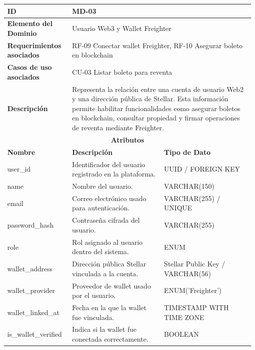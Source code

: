 \documentclass[12pt,letterpaper]{article}
\begin{document}
\begin{table}[H]
\centering
\scriptsize
\renewcommand{\arraystretch}{1.12}
\setlength{\tabcolsep}{4pt}

\begin{tabularx}{\textwidth}{|p{3.2cm}|X|p{3.8cm}|}
\hline
\textbf{ID} & MD-03 & \\ \hline

\textbf{Elemento del Dominio} & 
\multicolumn{2}{X|}{Usuario Web3 y Wallet Freighter} \\ \hline

\textbf{Requerimientos asociados} & 
\multicolumn{2}{X|}{RF-09 Conectar wallet Freighter, RF-10 Asegurar boleto en blockchain} \\ \hline

\textbf{Casos de uso asociados} & 
\multicolumn{2}{X|}{CU-03 Listar boleto para reventa} \\ \hline

\textbf{Descripción} & 
\multicolumn{2}{X|}{Representa la relación entre una cuenta de usuario Web2 y una dirección pública de Stellar. Esta información permite habilitar funcionalidades como asegurar boletos en blockchain, consultar propiedad y firmar operaciones de reventa mediante Freighter.} \\ \hline

\multicolumn{3}{|c|}{\textbf{Atributos}} \\ \hline

\textbf{Nombre} & \textbf{Descripción} & \textbf{Tipo de Dato} \\ \hline

user\_id & Identificador del usuario registrado en la plataforma. & UUID / FOREIGN KEY \\ \hline
name & Nombre del usuario. & VARCHAR(150) \\ \hline
email & Correo electrónico usado para autenticación. & VARCHAR(255) / UNIQUE \\ \hline
password\_hash & Contraseña cifrada del usuario. & VARCHAR(255) \\ \hline
role & Rol asignado al usuario dentro del sistema. & ENUM\\ \hline
wallet\_address & Dirección pública Stellar vinculada a la cuenta. & Stellar Public Key / VARCHAR(56) \\ \hline
wallet\_provider & Proveedor de wallet usado por el usuario. & ENUM('Freighter') \\ \hline
wallet\_linked\_at & Fecha en la que la wallet fue vinculada. & TIMESTAMP WITH TIME ZONE \\ \hline
is\_wallet\_verified & Indica si la wallet fue conectada correctamente. & BOOLEAN \\ \hline


\end{tabularx}
\end{table}
\end{document}

